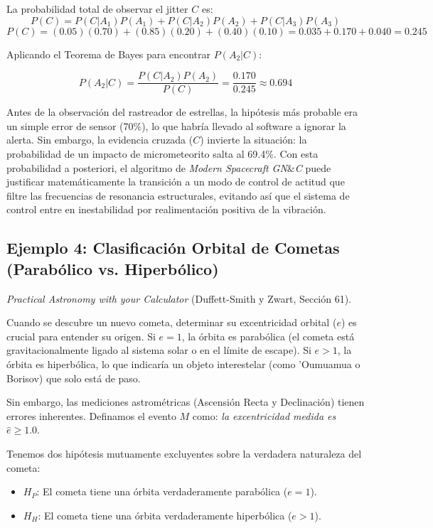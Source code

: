 La probabilidad total de observar el jitter $C$ es:
$$ P(C) = P(C | A_1)P(A_1) + P(C | A_2)P(A_2) + P(C | A_3)P(A_3) $$
$$ P(C) = (0.05)(0.70) + (0.85)(0.20) + (0.40)(0.10) = 0.035 + 0.170 + 0.040 = 0.245 $$

Aplicando el Teorema de Bayes para encontrar $P(A_2 | C)$:

$$ P(A_2 | C) = \frac{P(C | A_2) P(A_2)}{P(C)} = \frac{0.170}{0.245} \approx 0.694 $$

Antes de la observación del rastreador de estrellas, la hipótesis más probable era un simple error de sensor (70\%), lo que habría llevado al software a ignorar la alerta. Sin embargo, la evidencia cruzada ($C$) invierte la situación: la probabilidad de un impacto de micrometeorito salta al 69.4\%. Con esta probabilidad a posteriori, el algoritmo de \textit{Modern Spacecraft GN$\&$C} puede justificar matemáticamente la transición a un modo de control de actitud que filtre las frecuencias de resonancia estructurales, evitando así que el sistema de control entre en inestabilidad por realimentación positiva de la vibración.

\subsection{Ejemplo 4: Clasificación Orbital de Cometas (Parabólico vs. Hiperbólico)}

\textit{Practical Astronomy with your Calculator} (Duffett-Smith y Zwart, Sección 61). 

Cuando se descubre un nuevo cometa, determinar su excentricidad orbital ($e$) es crucial para entender su origen. Si $e = 1$, la órbita es parabólica (el cometa está gravitacionalmente ligado al sistema solar o en el límite de escape). Si $e > 1$, la órbita es hiperbólica, lo que indicaría un objeto interestelar (como 'Oumuamua o Borisov) que solo está de paso.

Sin embargo, las mediciones astrométricas (Ascensión Recta y Declinación) tienen errores inherentes. Definamos el evento $M$ como: \textit{la excentricidad medida es } $\hat{e} \ge 1.0$. 

Tenemos dos hipótesis mutuamente excluyentes sobre la verdadera naturaleza del cometa:
\begin{itemize}
    \item $H_P$: El cometa tiene una órbita verdaderamente parabólica ($e = 1$).
    \item $H_H$: El cometa tiene una órbita verdaderamente hiperbólica ($e > 1$).
\end{itemize}

